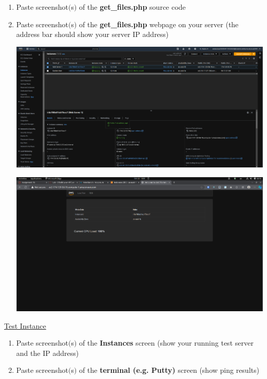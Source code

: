 \documentclass[11pt]{article}
\begin{document}
\begin{enumerate}[resume]
    \item Paste screenshot$($s$)$ of the \textbf{get\_files.php} source code \\
    \vspace{-0.02mm}

    
    \item Paste screenshot$($s$)$ of the \textbf{get\_files.php} webpage on your server (the address bar should show your server IP address)\\
    \vspace{5mm}


    {\centering
    \includegraphics[width=5.8in]{pics/15a.png}
    }
    

    {\centering
    \includegraphics[width=5.8in]{pics/15b.png}
    }
    
        
\end{enumerate}

\newpage

\noindent\underline{Test Instance}

\vspace{0.5cm}

\begin{enumerate}[resume]
    \item Paste screenshot$($s$)$ of the \textbf{Instances} screen (show your running test server and the IP address)\\
    \vspace{-0.02mm}

    
    \item Paste screenshot$($s$)$ of the \textbf{terminal (e.g. Putty)} screen (show ping results)\\
    \vspace{5mm}    
    
        
\end{enumerate}
\end{document}
